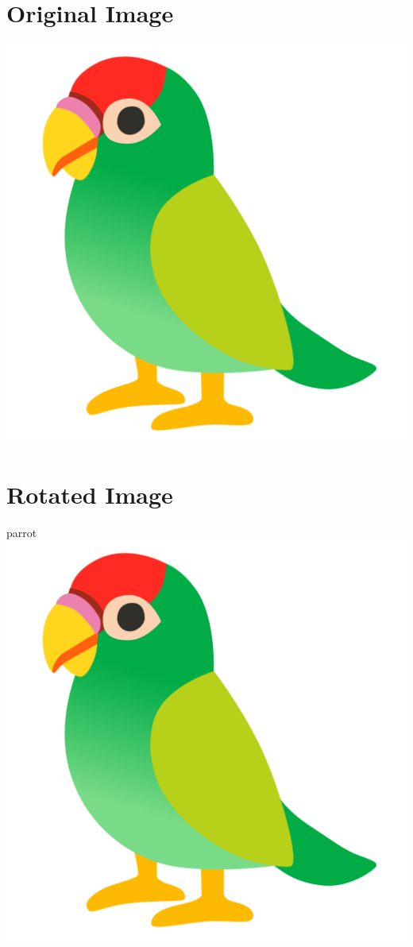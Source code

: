 \documentclass{article}
\begin{document}
    \color{MyDarkBlue}
    \section{Original Image}
    \includegraphics{images/parrot.png}
    
    \section{Rotated Image}
    parrot
    \includegraphics[angle=180]{images/parrot.png}
   
\end{document}
